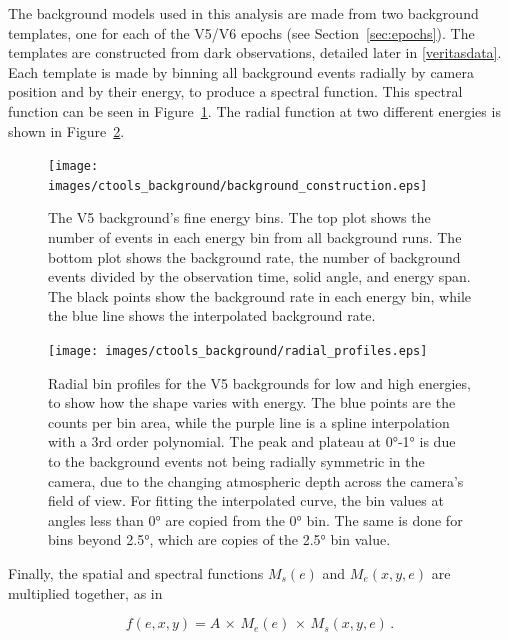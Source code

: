     The background models used in this analysis are made from two background templates, one for each of the V5/V6 epochs (see Section~\ref{sec:epochs}).
    The templates are constructed from dark observations, detailed later in \ref{veritasdata}.
    Each template is made by binning all background events radially by camera position and by their energy, to produce a spectral function.
    This spectral function can be seen in Figure~\ref{fig:background_profile}.
    The radial function at two different energies is shown in Figure~\ref{fig:background_radial}.

    \begin{figure}[p]
      \centering
      \texttt{[image: images/ctools\_background/background\_construction.eps]}
      \caption[Background Template with Fine Energy Bins]{
        The V5 background's fine energy bins.
        The top plot shows the number of events in each energy bin from all background runs.
        The bottom plot shows the background rate, the number of background events divided by the observation time, solid angle, and energy span.
        The black points show the background rate in each energy bin, while the blue line shows the interpolated background rate.
      }
      \label{fig:background_profile}
    \end{figure}

    \begin{figure}[hb]
      \centering
      \texttt{[image: images/ctools\_background/radial\_profiles.eps]}
      \caption[Radial Profiles of a Background Template]{
        Radial bin profiles for the V5 backgrounds for low and high energies, to show how the shape varies with energy.
        The blue points are the counts per bin area, while the purple line is a spline interpolation with a 3rd order polynomial.
        The peak and plateau at \ang{0}-\ang{1} is due to the background events not being radially symmetric in the camera, due to the changing atmospheric depth across the camera's field of view.
        For fitting the interpolated curve, the bin values at angles less than \ang{0} are copied from the \ang{0} bin.
        The same is done for bins beyond \ang{2.5}, which are copies of the \ang{2.5} bin value.
        }
      \label{fig:background_radial}
    \end{figure}
    
    Finally, the spatial and spectral functions $M_{s} \left ( e \right )$ and $M_e \left(x,y,e \right )$ are multiplied together, as in
    
    \begin{equation}\label{eqn:bck_template}
      f(e,x,y) = A \, \times \, M_{e} \left ( e \right ) \, \times \, M_{s} \left ( x, y, e \right ) \,.
    \end{equation} 
    

